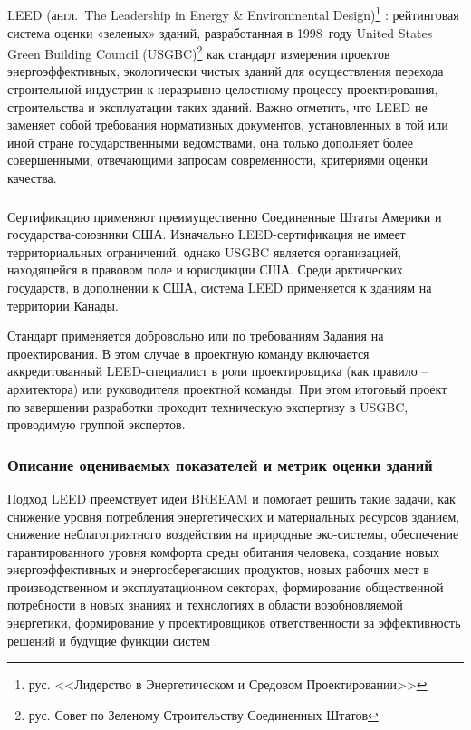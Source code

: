 \subsection{}
LEED (\mbox{англ.}~The Leadership in Energy \& Environmental Design)\footnote{рус. <<Лидерство в Энергетическом и Средовом Проектировании>>} \cite{method_US_LEED}:
рейтинговая система оценки «зеленых» зданий, разработанная в 1998~году United States Green Building Council (USGBC)\footnote{рус. Совет по Зеленому Строительству Соединенных Штатов}
как стандарт измерения проектов энергоэффективных, экологически чистых зданий для осуществления перехода строительной индустрии к неразрывно целостному процессу
проектирования, строительства и эксплуатации таких зданий.
Важно отметить, что LEED не заменяет собой требования нормативных документов, установленных в той или иной стране государственными ведомствами,
она только дополняет более совершенными, отвечающими запросам современности, критериями оценки качества.



\subsubsection*{\scAssesmentScope}
Сертификацию применяют преимущественно Соединенные Штаты Америки и государства-союзники США. Изначально LEED-сертификация не имеет территориальных ограничений,
однако USGBC является организацией, находящейся в правовом поле и юрисдикции США.
Среди арктических государств, в дополнении к США, система LEED применяется к зданиям на территории Канады.

Стандарт применяется добровольно или по требованиям Задания на проектирования. В этом случае в проектную команду включается аккредитованный
LEED-специалист в роли проектировщика (как правило -- архитектора) или руководителя проектной команды.
При этом итоговый проект по завершении разработки проходит техническую экспертизу в USGBC, проводимую группой экспертов.

\subsubsection*{Описание оцениваемых показателей и метрик оценки зданий}
Подход LEED преемствует идеи BREEAM и помогает решить такие задачи, как снижение уровня потребления энергетических и материальных ресурсов зданием,
снижение неблагоприятного воздействия на природные эко-системы, обеспечение гарантированного уровня комфорта среды обитания человека,
создание новых энергоэффективных и энергосберегающих продуктов, новых рабочих мест в производственном и эксплуатационном секторах,
формирование общественной потребности в новых знаниях и технологиях в области возобновляемой энергетики, формирование у проектировщиков ответственности за
эффективность решений и будущие функции систем \cite{method_US_LEED}.

